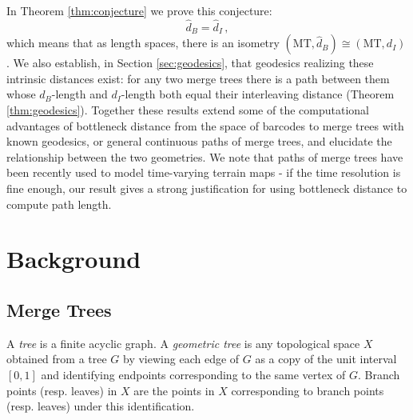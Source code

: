 \documentclass{article}
\theoremstyle{definition}
\newcommand{\MT}{\mathrm{MT}}
\begin{document}
In Theorem \ref{thm:conjecture} we prove this conjecture:
\[\widehat{d}_B = \widehat{d}_I\,,\]
which means that as length spaces, there is an isometry $(\MT, \widehat{d}_B) \cong (\MT, d_I)$.
We also establish, in Section \ref{sec:geodesics}, that geodesics realizing these intrinsic distances exist: for any two merge trees there is a path between them whose $d_B$-length and $d_I$-length both equal their interleaving distance (Theorem \ref{thm:geodesics}).  Together these results extend some of the computational advantages of bottleneck distance from the space of barcodes to merge trees with known geodesics, or general continuous paths of merge trees, and elucidate the relationship between the two geometries. We note that paths of merge trees have been recently used to model time-varying terrain maps \cite{beurskens2025ordered, yan2022geometry} - if the time resolution is fine enough, our result gives a strong justification for using bottleneck distance to compute path length. 

\section{Background}\label{sec:background}

\subsection{Merge Trees}

A \emph{tree} is a finite acyclic graph. A \emph{geometric tree} is any topological space $X$ obtained from a tree $G$ by viewing each edge of $G$ as a copy of the unit interval $[0,1]$ and identifying endpoints corresponding to the same vertex of $G$. Branch points (resp. leaves) in $X$ are the points in $X$ corresponding to branch points (resp. leaves) under this identification.
\end{document}
